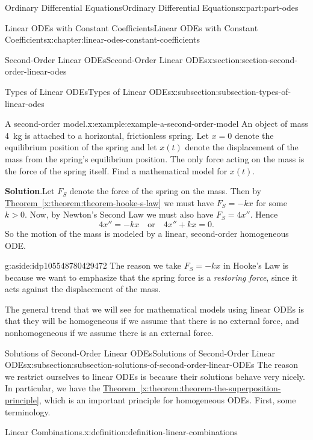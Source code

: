 \documentclass[oneside,10pt,]{book}
\newcommand{\blocktitlefont}{\relax}
\newcommand{\xreffont}{\relax}
\numberwithin{equation}{part}
\begin{document}
\begin{partptx}{Ordinary Differential Equations}{}{Ordinary Differential Equations}{}{}{x:part:part-odes}
\begin{chapterptx}{Linear ODEs with Constant Coefficients}{}{Linear ODEs with Constant Coefficients}{}{}{x:chapter:linear-odes-constant-coefficients}
\begin{sectionptx}{Second-Order Linear ODEs}{}{Second-Order Linear ODEs}{}{}{x:section:section-second-order-linear-odes}
\begin{subsectionptx}{Types of Linear ODEs}{}{Types of Linear ODEs}{}{}{x:subsection:subsection-types-of-linear-odes}
\begin{example}{A second-order model.}{x:example:example-a-second-order-model}
An object of mass \SI{4}{\kilo\gram} is attached to a horizontal, frictionless spring. Let \(x=0\) denote the equilibrium position of the spring and let \(x(t)\) denote the displacement of the mass from the spring's equilibrium position. The only force acting on the mass is the force of the spring itself. Find a mathematical model for \(x(t)\).%
\par\smallskip%
\noindent\textbf{\blocktitlefont Solution}.\hypertarget{g:solution:idp105548780426656}{}\quad{}Let \(F_{S}\) denote the force of the spring on the mass. Then by \hyperref[x:theorem:theorem-hooke-s-law]{Theorem~{\xreffont\ref{x:theorem:theorem-hooke-s-law}}} we must have \(F_{S} = -kx\) for some \(k>0\). Now, by Newton's Second Law we must also have \(F_{S} = 4x''\). Hence%
\begin{equation*}
4x'' = -kx\quad\text{or}\quad4x''+kx = 0.
\end{equation*}
So the motion of the mass is modeled by a linear, second-order homogeneous ODE.%
\end{example}
\begin{aside}{}{g:aside:idp105548780429472}%
The reason we take \(F_{S} = -kx\) in Hooke's Law is because we want to emphasize that the spring force is a \emph{restoring force}, since it acts against the displacement of the mass.%
\end{aside}
The general trend that we will see for mathematical models using linear ODEs is that they will be homogeneous if we assume that there is no external force, and nonhomogeneous if we assume there is an external force.%
\end{subsectionptx}
%
%
\typeout{************************************************}
\typeout{************************************************}
%
\begin{subsectionptx}{Solutions of Second-Order Linear ODEs}{}{Solutions of Second-Order Linear ODEs}{}{}{x:subsection:subsection-solutions-of-second-order-linear-ODEs}
The reason we restrict ourselves to linear ODEs is because their solutions behave very nicely. In particular, we have the \hyperref[x:theorem:theorem-the-superposition-principle]{Theorem~{\xreffont\ref{x:theorem:theorem-the-superposition-principle}}}, which is an important principle for homogeneous ODEs. First, some terminology.%
\begin{definition}{Linear Combinations.}{x:definition:definition-linear-combinations}%
%

\end{definition}
\end{subsectionptx}
\end{sectionptx}
\end{chapterptx}
\end{partptx}
\end{document}
